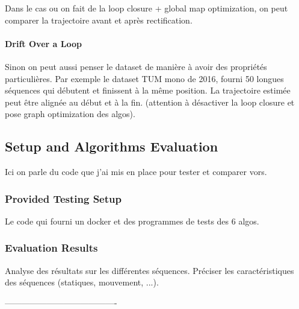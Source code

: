 Dans le cas ou on fait de la loop closure + global map optimization,
on peut comparer la trajectoire avant et après rectification.

\paragraph{Drift Over a Loop}%
\label{par:drift_loop}

Sinon on peut aussi penser le dataset de manière à avoir des propriétés particulières.
Par exemple le dataset TUM mono de 2016, fourni 50 longues séquences qui débutent
et finissent à la même position.
La trajectoire estimée peut être alignée au début et à la fin.
(attention à désactiver la loop closure et pose graph optimization des algos).

\subsection{Setup and Algorithms Evaluation}%
\label{sub:algorithms_eval}

Ici on parle du code que j'ai mis en place pour tester et comparer vors.

\subsubsection{Provided Testing Setup}%
\label{ssub:setup}

Le code qui fourni un docker et des programmes de tests des 6 algos.

\subsubsection{Evaluation Results}%
\label{ssub:eval_results}

Analyse des résultats sur les différentes séquences.
Préciser les caractéristiques des séquences (statiques, mouvement, ...).


----------------------------------------

